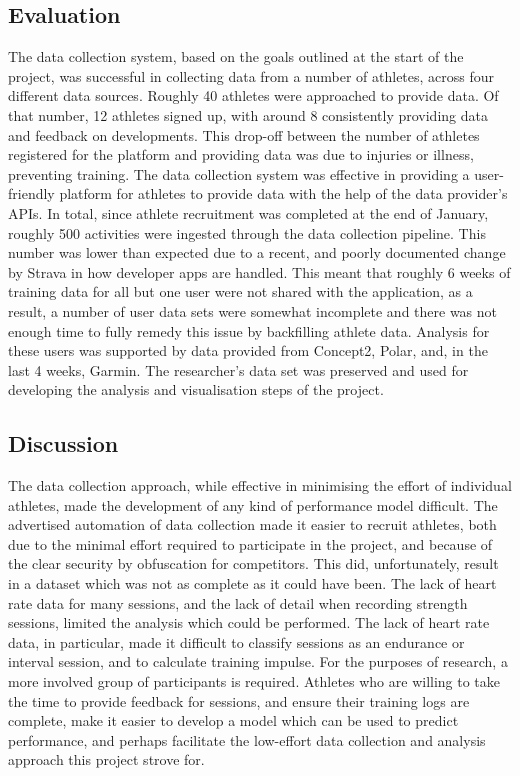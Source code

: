\subsection{Evaluation}
The data collection system, based on the goals outlined at the start of the project, was successful in collecting data from a number of athletes, across four different data sources. Roughly 40 athletes were approached to provide data. Of that number, 12 athletes signed up, with around 8 consistently providing data and feedback on developments. This drop-off between the number of athletes registered for the platform and providing data was due to injuries or illness, preventing training. The data collection system was effective in providing a user-friendly platform for athletes to provide data with the help of the data provider's APIs. In total, since athlete recruitment was completed at the end of January, roughly 500 activities were ingested through the data collection pipeline. This number was lower than expected due to a recent, and poorly documented change by Strava in how developer apps are handled. This meant that roughly 6 weeks of training data for all but one user were not shared with the application, as a result, a number of user data sets were somewhat incomplete and there was not enough time to fully remedy this issue by backfilling athlete data. Analysis for these users was supported by data provided from Concept2, Polar, and, in the last 4 weeks, Garmin. The researcher's data set was preserved and used for developing the analysis and visualisation steps of the project.

\subsection{Discussion}
The data collection approach, while effective in minimising the effort of individual athletes, made the development of any kind of performance model difficult. The advertised automation of data collection made it easier to recruit athletes, both due to the minimal effort required to participate in the project, and because of the clear security by obfuscation for competitors. This did, unfortunately, result in a dataset which was not as complete as it could have been. The lack of heart rate data for many sessions, and the lack of detail when recording strength sessions, limited the analysis which could be performed. The lack of heart rate data, in particular, made it difficult to classify sessions as an endurance or interval session, and to calculate training impulse. For the purposes of research, a more involved group of participants is required. Athletes who are willing to take the time to provide feedback for sessions, and ensure their training logs are complete, make it easier to develop a model which can be used to predict performance, and perhaps facilitate the low-effort data collection and analysis approach this project strove for. 

